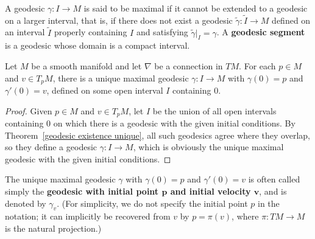 A geodesic $\gamma:I\to M$ is said to be maximal if it cannot be extended to a geodesic on a larger interval, that is, if there does not exist a 
geodesic $\tilde{\gamma}:\widetilde{I}\to M$ defined on an interval $\widetilde{I}$ properly containing $I$ and satisfying $\tilde{\gamma}|_I=\gamma$. 
A \textbf{geodesic segment} is a geodesic whose domain is a compact interval.
\begin{corollary}\label{geodesic maximal unique}
Let $M$ be a smooth manifold and let $\nabla$ be a connection in $TM$. For each $p\in M$ and $v\in T_pM$, there is a unique maximal geodesic $\gamma:I\to M$ 
with $\gamma(0)=p$ and $\gamma'(0)=v$, defined on some open interval $I$ containing $0$.
\end{corollary}
\begin{proof}
Given $p\in M$ and $v\in T_pM$, let $I$ be the union of all open intervals containing $0$ on which there is a geodesic with the given initial conditions. By 
Theorem~\ref{geodesic existence unique}, all such geodesics agree where they overlap, so they define a geodesic $\gamma:I\to M$, which is obviously the unique maximal geodesic with 
the given initial conditions.
\end{proof}
The unique maximal geodesic $\gamma$ with $\gamma(0)=p$ and $\gamma'(0)=v$ is often called simply the \textbf{geodesic with initial point $\bm{p}$ and initial velocity $\bm{v}$}, 
and is denoted by $\gamma_v$. (For simplicity, we do not specify the initial point $p$ in the notation; it can implicitly be recovered from $v$ by $p=\pi(v)$, 
where $\pi:TM\to M$ is the natural projection.)
